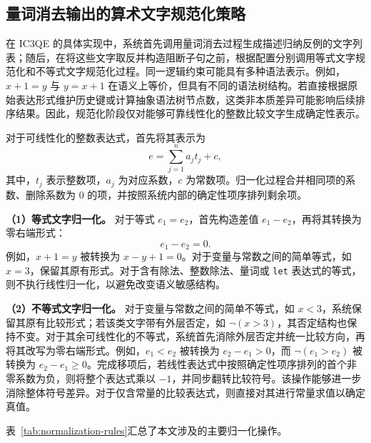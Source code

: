 \documentclass[11pt,a4paper]{article}
\begin{document}
\subsection{量词消去输出的算术文字规范化策略}

在 IC3QE 的具体实现中，系统首先调用量词消去过程生成描述归纳反例的文字列表；随后，在将这些文字取反并构造阻断子句之前，根据配置分别调用等式文字规范化和不等式文字规范化过程。同一逻辑约束可能具有多种语法表示。例如，$x+1=y$ 与 $y=x+1$ 在语义上等价，但具有不同的语法树结构。若直接根据原始表达形式维护历史键或计算抽象语法树节点数，这类非本质差异可能影响后续排序结果。因此，规范化阶段仅对能够可靠线性化的整数比较文字生成确定性表示。

对于可线性化的整数表达式，首先将其表示为
\begin{equation}
  e=\sum_{j=1}^{n}a_jt_j+c,
  \label{eq:linear-form}
\end{equation}
其中，$t_j$ 表示整数项，$a_j$ 为对应系数，$c$ 为常数项。归一化过程合并相同项的系数、删除系数为 $0$ 的项，并按照系统内部的确定性项序排列剩余项。

\noindent\textbf{（1）等式文字归一化。}
对于等式 $e_1=e_2$，首先构造差值 $e_1-e_2$，再将其转换为零右端形式：
\begin{equation}
  e_1-e_2=0.
  \label{eq:eq-normalization}
\end{equation}
例如，$x+1=y$ 被转换为 $x-y+1=0$。对于变量与常数之间的简单等式，如 $x=3$，保留其原有形式。对于含有除法、整数除法、量词或 \texttt{let} 表达式的等式，则不执行线性归一化，以避免改变语义敏感结构。

\noindent\textbf{（2）不等式文字归一化。}
对于变量与常数之间的简单不等式，如 $x<3$，系统保留其原有比较形式；若该类文字带有外层否定，如 $\neg(x>3)$，其否定结构也保持不变。对于其余可线性化的不等式，系统首先消除外层否定并统一比较方向，再将其改写为零右端形式。例如，$e_1<e_2$ 被转换为 $e_2-e_1>0$，而 $\neg(e_1>e_2)$ 被转换为 $e_2-e_1\geq 0$。完成移项后，若线性表达式中按照确定性项序排列的首个非零系数为负，则将整个表达式乘以 $-1$，并同步翻转比较符号。该操作能够进一步消除整体符号差异。对于仅含常量的比较表达式，则直接对其进行常量求值以确定真值。

表~\ref{tab:normalization-rules}汇总了本文涉及的主要归一化操作。
\end{document}
